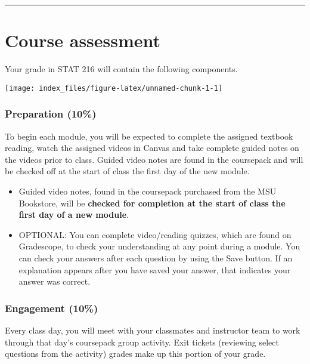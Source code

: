 \documentclass[
]{article}
\providecommand{\tightlist}{%
  \setlength{\itemsep}{0pt}\setlength{\parskip}{0pt}}
\begin{document}
\begin{center}\rule{0.5\linewidth}{0.5pt}\end{center}

\section{Course assessment}\label{course-assessment}

Your grade in STAT 216 will contain the following components.

\begin{center}\texttt{[image: index\_files/figure-latex/unnamed-chunk-1-1]} \end{center}

\subsubsection{Preparation (10\%)}\label{preparation-10}

To begin each module, you will be expected to complete the assigned
textbook reading, watch the assigned videos in Canvas and take complete
guided notes on the videos prior to class. Guided video notes are found
in the coursepack and will be checked off at the start of class the
first day of the new module.

\begin{itemize}
\tightlist
\item
  Guided video notes, found in the coursepack purchased from the MSU
  Bookstore, will be \textbf{checked for completion at the start of
  class the first day of a new module}.
\item
  OPTIONAL: You can complete video/reading quizzes, which are found on
  Gradescope, to check your understanding at any point during a module.
  You can check your answers after each question by using the Save
  button. If an explanation appears after you have saved your answer,
  that indicates your answer was correct.
\end{itemize}

\subsubsection{Engagement (10\%)}\label{engagement-10}

Every class day, you will meet with your classmates and instructor team
to work through that day's coursepack group activity. Exit tickets
(reviewing select questions from the activity) grades make up this
portion of your grade.
\end{document}
